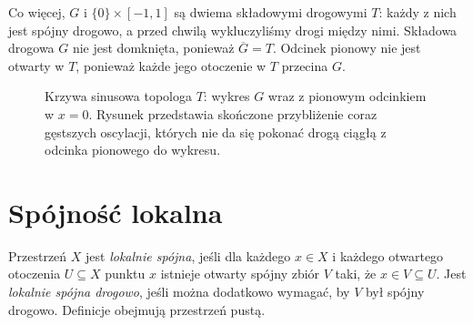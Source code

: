 \begin{przyklad}
Co więcej, $G$ i $\{0\}\times[-1,1]$
są dwiema składowymi drogowymi $T$:
każdy z nich jest spójny drogowo,
a przed chwilą wykluczyliśmy drogi
między nimi. Składowa drogowa $G$
nie jest domknięta, ponieważ $\overline G=T$.
Odcinek pionowy nie jest otwarty w $T$,
ponieważ każde jego otoczenie w $T$
przecina $G$.
\end{przyklad}

\begin{figure}[htbp]
\centering
{}
\caption{Krzywa sinusowa topologa $T$: wykres $G$ wraz
z pionowym odcinkiem w $x=0$. Rysunek przedstawia
skończone przybliżenie coraz gęstszych oscylacji,
których nie da się pokonać drogą ciągłą z odcinka
pionowego do wykresu.}
\label{fig:topog-spojnosc-sinus}
\end{figure}
\FloatBarrier

\section{Spójność lokalna}
\label{sec:topog-spojnosc-lokalna}

\begin{definicja}
\label{def:topog-spojnosc-lokalna}
Przestrzeń $X$ jest \emph{lokalnie spójna},
jeśli dla każdego $x\in X$ i każdego
otwartego otoczenia $U\subseteq X$ punktu $x$
istnieje otwarty spójny zbiór $V$ taki,
że $x\in V\subseteq U$.
Jest \emph{lokalnie spójna drogowo},
jeśli można dodatkowo wymagać, by $V$
był spójny drogowo. Definicje obejmują
przestrzeń pustą.
\end{definicja}

